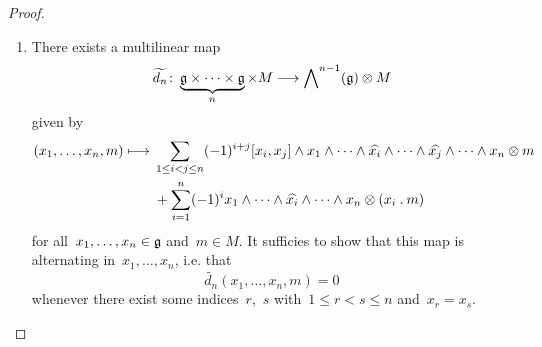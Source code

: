 \begin{proof}
  \leavevmode
  \begin{enumerate}
    \item
      There exists a multilinear map
      \[
        \widetilde{d_n}
        \colon
        \underbrace{ \glie \times \dotsb \times \glie }_{n} \times M
        \to
        \Exterior^{n-1}(\glie) \otimes M
      \]
      given by
      \begin{align}
        (x_1, \dotsc, x_n, m)
        \mapsto
        {}&
        \sum_{1 \leq i < j \leq n}
        (-1)^{i+j}
        [x_i, x_j] \wedge x_1 \wedge \dotsb \wedge \widehat{x_i} \wedge \dotsb \wedge \widehat{x_j} \wedge \dotsb \wedge x_n \otimes m
        \label{first term for homology}
        \\
        {}&
        +
        \sum_{i=1}^n
        (-1)^i
        x_1 \wedge \dotsb \wedge \widehat{x_i} \wedge \dotsb \wedge x_n \otimes (x_i \act m)
        \label{second term for homology}
      \end{align}
      for all~$x_1, \dotsc, x_n \in \mathfrak{g}$ and~$m \in M$.
      It sufficies to show that this map is alternating in~$x_1, \dotsc, x_n$, i.e. that
      \[
        \widetilde{d_n}(x_1, \dotsc, x_n, m) = 0
      \]
      whenever there exist some indices~$r$,~$s$ with~$1 \leq r < s \leq n$ and~$x_r = x_s$.%


\end{enumerate}
\end{proof}
